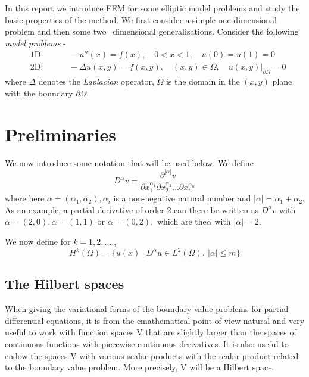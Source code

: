\hspace{5mm}In this report we introduce FEM for some elliptic model problems and study the basic properties of the method. We first consider a simple one-dimensional problem and then some two=dimensional generalisations. Consider the following \emph{model problems} - 
\begin{eqnarray}\nonumber
	&\text{1D: }&\qquad -u''(x) = f(x), \quad 0<x<1, \quad u(0) = u(1) = 0\\\nonumber
	&\text{2D: }&\qquad-\Delta u(x,y) = f(x,y), \quad (x,y) \in \Omega, \quad u(x,y)|_{\partial \Omega} = 0  
\end{eqnarray}
where $\Delta$ denotes the \emph{Laplacian} operator, $\Omega$ is the domain in the $(x,y)$ plane with the boundary $\partial \Omega$.

\section{Preliminaries}

We now introduce some notation that will be used below. We define
\begin{equation}
D^\alpha v = \frac{\partial ^{|\alpha|} v}{\partial x_1^{\alpha_1} \partial x_2^{\alpha_2} \dots \partial x_n^{\alpha_n}}
\end{equation}
where here $\alpha = (\alpha_1,\alpha_2), \alpha_i $ is a non-negative natural number and $|\alpha| = \alpha_1 + \alpha_2$. As an example, a partial derivative of order 2 can there be written as  $D^\alpha v $ with $\alpha=(2,0), \alpha = (1,1)$ or $\alpha =(0,2), $ which are the$\alpha$ with $|\alpha| = 2$.

We now define for $k = 1,2, .... ,$
\begin{equation}
H^k(\Omega) = \Big\{ u(x) \ \Big| \ D^\alpha u \in L^2(\Omega), \ |\alpha|\le m   \Big\}
\end{equation} 

\subsection{The Hilbert spaces}
When giving the variational forms of the boundary value problems for partial differential equations, it is from the emathematical point of view natural and very useful to work with function spaces V that are slightly larger than the spaces of continuous functions with piecewise continuous derivatives. It is also useful to endow the spaces V with various scalar products with the scalar product related to the boundary value problem. More precisely, V will be a Hilbert space.

